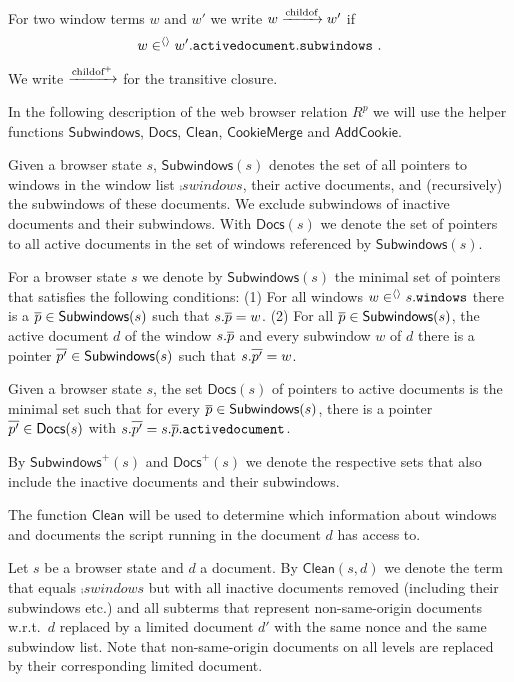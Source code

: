 \begin{definition} For two window terms $w$ and $w'$ we
  write $w \xrightarrow{\text{childof}} w'$ if \\
  \[w \in^{\langle\rangle} {{w'}.\mathtt{activedocument}}.\mathtt{subwindows}\text{\ .}\]
We write
  $\xrightarrow{\text{childof}^+}$ for the transitive closure.
\end{definition}

In the following description of the web browser relation
$R^p$ we will use the helper functions
$\mathsf{Subwindows}$, $\mathsf{Docs}$, $\mathsf{Clean}$,
$\mathsf{CookieMerge}$ and $\mathsf{AddCookie}$. 

Given a browser state $s$, $\mathsf{Subwindows}(s)$ denotes
the set of all pointers to windows in
the window list $\comp{s}{windows}$, their active
documents, and (recursively) the subwindows of these
documents. We exclude subwindows of inactive documents and
their subwindows. With $\mathsf{Docs}(s)$ we denote the set
of pointers to all active documents in the set of windows
referenced by $\mathsf{Subwindows}(s)$.
\begin{definition} 
  For a browser state $s$ we denote by
  $\mathsf{Subwindows}(s)$ the minimal set of
  pointers that satisfies the
  following conditions: (1) For all windows $w \in^{\langle\rangle}
  {s}.\mathtt{windows}$ there is a $\overline{p} \in
  \mathsf{Subwindows}(s)$ such that ${s}.\overline{p} =
  w$. (2) For all $\overline{p} \in \mathsf{Subwindows}(s)$, the
  active document $d$ of the window ${s}.\overline{p}$
  and every subwindow $w$ of $d$ there is a pointer
  $\overline{p'} \in \mathsf{Subwindows}(s)$ such that
  ${s}.\overline{p'} = w$.

  Given a browser state $s$, the set $\mathsf{Docs}(s)$ of
  pointers to active documents is the minimal set such that
  for every $\overline{p} \in \mathsf{Subwindows}(s)$, there is
  a pointer $\overline{p'} \in \mathsf{Docs}(s)$ with
  ${s}.\overline{p'} =
  {{s}.\overline{p}}.\mathtt{activedocument}$.
\end{definition}

By $\mathsf{Subwindows}^+(s)$ and $\mathsf{Docs}^+(s)$ we
denote the respective sets that also include the inactive
documents and their subwindows.

The function $\mathsf{Clean}$ will be used to determine
which information about windows and documents the script
running in the document $d$ has access to.
\begin{definition} Let $s$ be a browser state and $d$ a
  document.  By $\mathsf{Clean}(s, d)$ we denote the term
  that equals $\comp{s}{windows}$ but with all inactive
  documents removed (including their subwindows etc.) and
  all subterms that represent non-same-origin documents
  w.r.t.~$d$ replaced by a limited document $d'$ with the
  same nonce and the same subwindow list. Note that
  non-same-origin documents on all levels are replaced by
  their corresponding limited document.
\end{definition}

